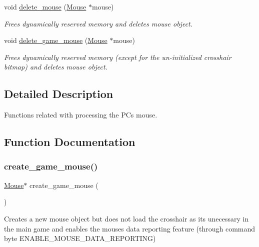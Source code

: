 \begin{DoxyCompactItemize}
void \hyperlink{group__mouse_ga6f0992f39a6073db60ab60697f049082}{delete\+\_\+mouse} (\hyperlink{struct_mouse}{Mouse} $\ast$mouse)
\begin{DoxyCompactList}\small\item\em Frees dynamically reserved memory and deletes mouse \textquotesingle{}object\textquotesingle{}. \end{DoxyCompactList}\item 
void \hyperlink{group__mouse_ga85ab65df1f1de5af9bdc7c96827c9d37}{delete\+\_\+game\+\_\+mouse} (\hyperlink{struct_mouse}{Mouse} $\ast$mouse)
\begin{DoxyCompactList}\small\item\em Frees dynamically reserved memory (except for the un-\/initialized crosshair bitmap) and deletes mouse \textquotesingle{}object\textquotesingle{}. \end{DoxyCompactList}\end{DoxyCompactItemize}


\subsection{Detailed Description}
Functions related with processing the PC\textquotesingle{}s mouse. 



\subsection{Function Documentation}
\hypertarget{group__mouse_gaba19df7ff1055c560171ddffd5026aef}{}\label{group__mouse_gaba19df7ff1055c560171ddffd5026aef} 
\subsubsection{\texorpdfstring{create\+\_\+game\+\_\+mouse()}{create\_game\_mouse()}}
{\footnotesize\ttfamily \hyperlink{struct_mouse}{Mouse}$\ast$ create\+\_\+game\+\_\+mouse (\begin{DoxyParamCaption}{ }\end{DoxyParamCaption})}



Creates a new mouse \textquotesingle{}object\textquotesingle{} but does not load the crosshair as it\textquotesingle{}s unecessary in the main game and enables the mouse\textquotesingle{}s data reporting feature (through command byte E\+N\+A\+B\+L\+E\+\_\+\+M\+O\+U\+S\+E\+\_\+\+D\+A\+T\+A\+\_\+\+R\+E\+P\+O\+R\+T\+I\+NG) 

